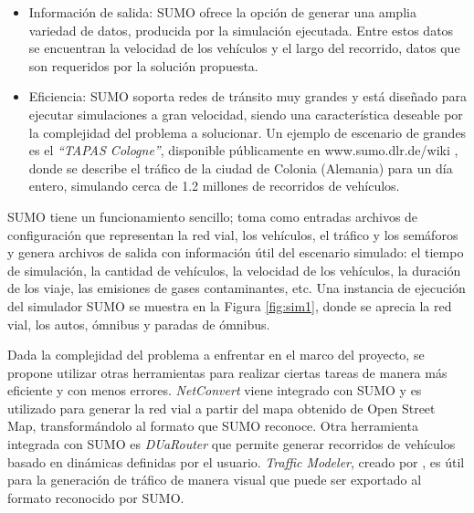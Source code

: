 \begin{itemize}
	\item Información de salida: SUMO ofrece la opción de generar una amplia variedad de datos, producida por la simulación ejecutada. Entre estos datos se encuentran la velocidad de los vehículos y el largo del recorrido, datos que son requeridos por la solución propuesta.
	
	\item Eficiencia: SUMO soporta redes de tránsito muy grandes y está diseñado para ejecutar simulaciones a gran velocidad, siendo una característica deseable por la complejidad del problema a solucionar. Un ejemplo de escenario de grandes es el \emph{``TAPAS Cologne''}, disponible públicamente en www.sumo.dlr.de/wiki , donde se describe el tráfico de la ciudad de Colonia (Alemania)  para un día entero, simulando cerca de 1.2 millones de recorridos de vehículos.
	
\end{itemize}


SUMO tiene un funcionamiento sencillo; toma como entradas archivos de configuración que representan la red vial, los vehículos, el tráfico y los semáforos y genera archivos de salida con información útil del escenario simulado: el tiempo de simulación, la cantidad de vehículos, la velocidad de los vehículos, la duración de los viaje, las emisiones de gases contaminantes, etc. Una instancia de ejecución del simulador SUMO se muestra en la Figura \ref{fig:sim1}, donde se aprecia la red vial, los autos, ómnibus y paradas de ómnibus.

Dada la complejidad del problema a enfrentar en el marco del proyecto, se propone utilizar otras herramientas para realizar ciertas tareas de manera más eficiente y con menos errores. \emph{NetConvert} viene integrado con SUMO y es utilizado para generar la red vial a partir del mapa obtenido de Open Street Map, transformándolo al formato que SUMO reconoce. Otra herramienta integrada con SUMO es \emph{DUaRouter} que permite generar recorridos de vehículos basado en dinámicas definidas por el usuario. \emph{Traffic Modeler}, creado por \citet{TrafficModeler}, es útil para la generación de tráfico de manera visual que puede ser exportado al formato reconocido por SUMO. 
	



